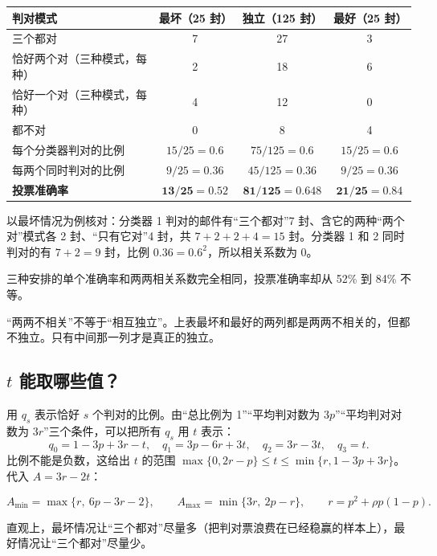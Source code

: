 \documentclass[11pt]{article}
\begin{document}
\begin{center}
\small
\begin{tabular}{lccc}
\toprule
判对模式 & 最坏（25 封） & 独立（125 封） & 最好（25 封）\\
\midrule
三个都对 & 7 & 27 & 3\\
恰好两个对（三种模式，每种） & 2 & 18 & 6\\
恰好一个对（三种模式，每种） & 4 & 12 & 0\\
都不对 & 0 & 8 & 4\\
\midrule
每个分类器判对的比例 & $15/25=0.6$ & $75/125=0.6$ & $15/25=0.6$\\
每两个同时判对的比例 & $9/25=0.36$ & $45/125=0.36$ & $9/25=0.36$\\
\midrule
\textbf{投票准确率} & $\mathbf{13/25=0.52}$ & $\mathbf{81/125=0.648}$ & $\mathbf{21/25=0.84}$\\
\bottomrule
\end{tabular}
\end{center}

以最坏情况为例核对：分类器 1 判对的邮件有“三个都对”7 封、含它的两种“两个对”模式各 2 封、“只有它对”4 封，共 $7+2+2+4=15$ 封。分类器 1 和 2 同时判对的有 $7+2=9$ 封，比例 $0.36=0.6^2$，所以相关系数为 0。

三种安排的单个准确率和两两相关系数完全相同，投票准确率却从 52\% 到 84\% 不等。

\begin{warnbox}[title=常见误解]
“两两不相关”不等于“相互独立”。上表最坏和最好的两列都是两两不相关的，但都不独立。只有中间那一列才是真正的独立。
\end{warnbox}

\subsection{$t$ 能取哪些值？}
用 $q_s$ 表示恰好 $s$ 个判对的比例。由“总比例为 1”“平均判对数为 $3p$”“平均判对对数为 $3r$”三个条件，可以把所有 $q_s$ 用 $t$ 表示：
\[
q_0=1-3p+3r-t,\quad q_1=3p-6r+3t,\quad q_2=3r-3t,\quad q_3=t .
\]
比例不能是负数，这给出 $t$ 的范围 $\max\{0,2r-p\}\le t\le\min\{r,1-3p+3r\}$。代入 $A=3r-2t$：

\begin{goodbox}[title=三个分类器的精确区间]
\[
A_{\min}=\max\{r,\ 6p-3r-2\},\qquad A_{\max}=\min\{3r,\ 2p-r\},\qquad r=p^2+\rho p(1-p).
\]
\end{goodbox}

直观上，最坏情况让“三个都对”尽量多（把判对票浪费在已经稳赢的样本上），最好情况让“三个都对”尽量少。
\end{document}
